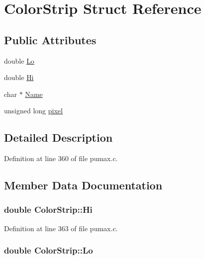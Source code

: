 \hypertarget{struct_color_strip}{
\section{\-Color\-Strip \-Struct \-Reference}
\label{struct_color_strip}
}
\subsection*{\-Public \-Attributes}
\begin{DoxyCompactItemize}
\item 
double \hyperlink{struct_color_strip_a4f6280212828381ae297b3f9565e7ce8}{\-Lo}
\item 
double \hyperlink{struct_color_strip_a6deff3a5a5614df503a3af930233730b}{\-Hi}
\item 
char $\ast$ \hyperlink{struct_color_strip_a8be72b425d4dae5555815f0108a2a2b9}{\-Name}
\item 
unsigned long \hyperlink{struct_color_strip_ab1a6137a580d2a1817f4d8e127d4743c}{pixel}
\end{DoxyCompactItemize}


\subsection{\-Detailed \-Description}


\-Definition at line 360 of file pumax.\-c.



\subsection{\-Member \-Data \-Documentation}
\hypertarget{struct_color_strip_a6deff3a5a5614df503a3af930233730b}{
\subsubsection[{\-Hi}]{\setlength{\rightskip}{0pt plus 5cm}double {\bf \-Color\-Strip\-::\-Hi}}}
\label{struct_color_strip_a6deff3a5a5614df503a3af930233730b}


\-Definition at line 363 of file pumax.\-c.

\hypertarget{struct_color_strip_a4f6280212828381ae297b3f9565e7ce8}{
\subsubsection[{\-Lo}]{\setlength{\rightskip}{0pt plus 5cm}double {\bf \-Color\-Strip\-::\-Lo}}}
\label{struct_color_strip_a4f6280212828381ae297b3f9565e7ce8}



